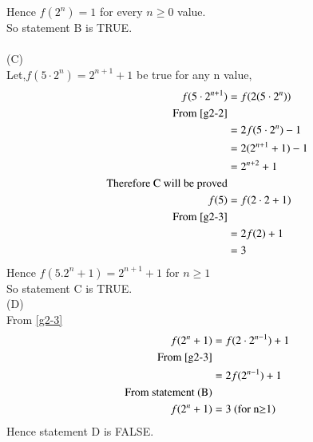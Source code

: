 \documentclass[journal,12pt,twocolumn]{IEEEtran}
\theoremstyle{remark}
\begin{document}
Hence $f(2^n)=1$ for every $n\geq0$ value.\\
So statement B is TRUE.\\
\\(C)\\
Let,$f(5\cdot2^n)=2^{n+1}+1$ be true for any n value,
\begin{align}
        f(5\cdot2^{n+1})&=f(2(5\cdot2^n))\\
	\text{From \eqref{g2-2}}\\
        &=2f(5\cdot2^n)-1\\
        &=2(2^{n+1}+1)-1\\
        &=2^{n+2}+1\\
        \notag\text{Therefore C will be proved}\\
         f(5)&=f(2\cdot2+1)\\
	 \notag\text{From \eqref{g2-3}}\\
        &=2f(2)+1\\
        &=3
\end{align}
Hence $f(5.2^n+1)=2^{n+1}+1$ for $n\geq1$\\
So statement C is TRUE.\\
(D)\\
From \eqref{g2-3}
\begin{align}
	f(2^n+1)&=f(2\cdot2^{n-1})+1\\
	\notag\text{From \eqref{g2-3}}\\
	&=2f(2^{n-1})+1\\
	\notag\text{From statement (B)}\\
	f(2^n+1)&=3\text{  (for n$\geq$1})
\end{align}
Hence statement D is FALSE.
\end{document}
